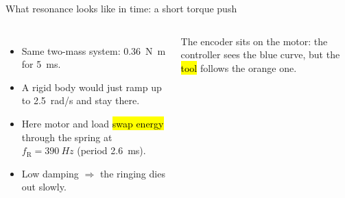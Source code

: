 \documentclass[aspectratio=169,10pt]{beamer}
\newcommand{\dat}[1]{data/#1.dat}
\begin{document}
\begin{frame}[t]{What resonance looks like in time: a short torque push}
\begin{columns}[T,onlytextwidth]
\centering
{}
\begin{itemize}\small
\item Same two-mass system: \SI{0.36}{N.m} for \SI{5}{ms}.
\item A rigid body would just ramp up to \SI{2.5}{rad/s} and stay there.
\item Here motor and load \hl{swap energy} through the spring at $f_\text{R}=\SI{390}{Hz}$ (period \SI{2.6}{ms}).
\item Low damping $\Rightarrow$ the ringing dies out slowly.
\end{itemize}
\begin{notebox}
\small The encoder sits on the motor: the controller sees the blue curve, but the \hl{tool} follows the orange one.
\end{notebox}
\end{columns}
\end{frame}
\end{document}
